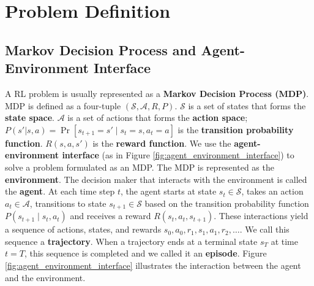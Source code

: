 \chapter{Problem Definition}

\section{Markov Decision Process and Agent-Environment Interface} \label{sec:markov}
A RL problem is usually represented as a \textbf{Markov Decision Process (MDP)}.
MDP is defined as a four-tuple $(\mathcal{S}, \mathcal{A}, R, P)$.
$\mathcal{S}$ is a set of states that forms the \textbf{state space}.
$\mathcal{A}$ is a set of actions that forms the \textbf{action space};
$P(s' | s, a) = \operatorname{Pr}[ s_{t+1} = s' \mid  s_t = s, a_t = a]$ is the \textbf{transition probability function}.
$R(s, a, s')$ is the \textbf{reward function}.
We use the \textbf{agent-environment interface} (as in Figure \ref{fig:agent_environment_interface}) to solve a problem formulated as an MDP.
The MDP is represented as the \textbf{environment}.
The decision maker that interacts with the environment is called the \textbf{agent}.
At each time step $t$, the agent starts at state $s_t \in \mathcal{S}$, takes an action $a_t \in \mathcal{A}$,
transitions to state $s_{t+1} \in \mathcal{S}$ based on the transition probability function $P(s_{t+1} \mid s_t, a_t)$
and receives a reward $R(s_t, a_t, s_{t+1})$.
These interactions yield a sequence of actions, states, and rewards $s_{0}, a_{0}, r_{1}, s_{1}, a_{1}, r_{2}, \dots$.
We call this sequence a \textbf{trajectory}.
When a trajectory ends at a terminal state $s_T$ at time $t = T$, this sequence is completed and we called it an \textbf{episode}.
Figure \ref{fig:agent_environment_interface} illustrates the interaction between the agent and the environment.



